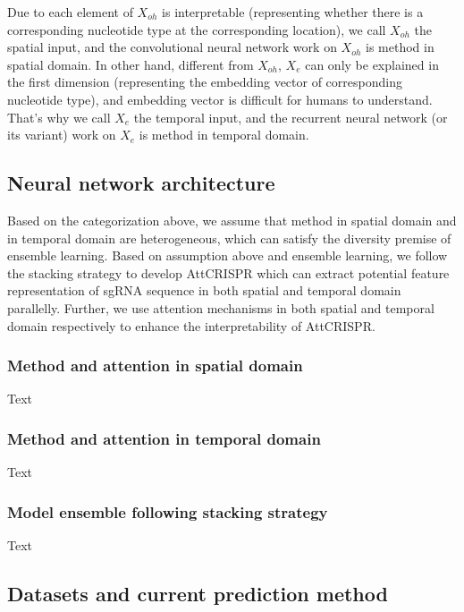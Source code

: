 \documentclass{bioinfo}
\begin{document}
Due to each element of $X_{oh}$ is interpretable (representing whether there is a corresponding nucleotide type at the corresponding location), 
we call $X_{oh}$ the spatial input, and the convolutional neural network work on $X_{oh}$ is method in spatial domain. 
In other hand, different from $X_{oh}$, $X_e$ can only be explained in the first dimension (representing the embedding vector of corresponding nucleotide type), 
and embedding vector is difficult for humans to understand. 
That's why we call $X_e$ the temporal input, and the recurrent neural network (or its variant) work on $X_e$ is method in temporal domain. 

\subsection{Neural network architecture}

Based on the categorization above, we assume that method in spatial domain and in temporal domain are heterogeneous, 
which can satisfy the diversity premise of ensemble learning. 
Based on assumption above and ensemble learning, we follow the stacking strategy to develop AttCRISPR 
which can extract potential feature representation of sgRNA sequence in both spatial and temporal domain parallelly. 
Further, we use attention mechanisms in both spatial and temporal domain respectively to enhance the interpretability of AttCRISPR.

\subsubsection{Method and attention in spatial domain}

Text

\subsubsection{Method and attention in temporal domain}

Text

\subsubsection{Model ensemble following stacking strategy}

Text

\subsection{Datasets and current prediction method}
\end{document}
